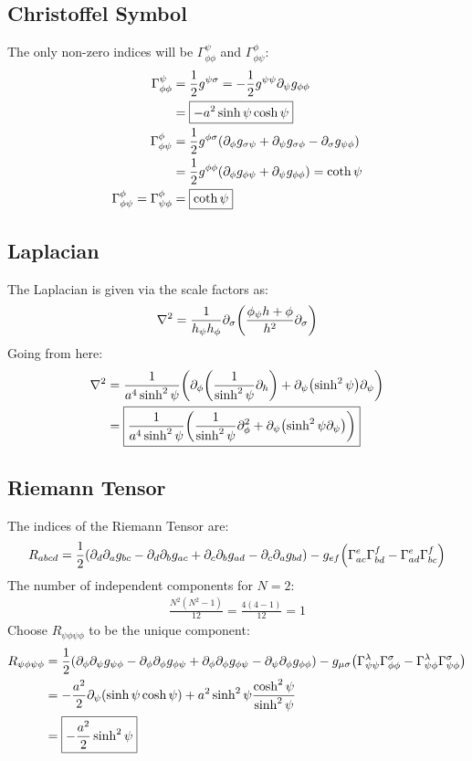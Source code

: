 \documentclass[12pt]{article}
\newcommand{\D}{\partial}
\newcommand{\h}{\phi}
\newcommand{\s}{\psi}
\begin{document}
\subsection{Christoffel Symbol}
The only non-zero indices will be $\Gamma^\s_{\h\h}$ and $\Gamma^\h_{\h\s}$:
\begin{align*}
  \Gamma^\s_{\h\h}&=\frac{1}{2}g^{\s\sigma}=-\frac{1}{2}g^{\s\s}\D_\s g_{\h\h}\\
  &=\boxed{-a^2\sinh\s\cosh\s}\\
  \Gamma^\h_{\h\s}&=\frac{1}{2}g^{\h\sigma}\qty(\D_\h g_{\sigma\s}+
  \D_\s g_{\sigma\h}-\D_\sigma g_{\s\h})\\
  &=\frac{1}{2}g^{\h\h}\qty(\D_\h g_{\h\s}+\D_\s g_{\h\h})=\coth\s\\
  \Gamma^\h_{\h\s}=\Gamma^\h_{\s\h}&=\boxed{\coth\s}
\end{align*}
\subsection{Laplacian}
The Laplacian is given via the scale factors as:
\begin{align*}
  \laplacian = \frac{1}{h_\s h_\h}\D_\sigma\qty(\frac{\h_\s h+\h}{h^2}\D_\sigma)
\end{align*}
Going from here:
\begin{align*}
  \laplacian&=\frac{1}{a^4\sinh^2\s}\qty(\D_\h\qty(\frac{1}{\sinh^2\psi}\D_h)
  +\D_\s\qty(\sinh^2\s)\D_\s)\\
  &=\boxed{\frac{1}{a^4\sinh^2\psi}\qty(\frac{1}{\sinh^2\psi}\D^2_\phi
    +\D_\psi\qty(\sinh^2\psi\D_\psi))}
\end{align*}
\subsection{Riemann Tensor}
The indices of the Riemann Tensor are:
\begin{align*}
  R_{abcd}=\frac{1}{2}(\D_d\D_ag_{bc}-\D_d\D_bg_{ac}+\D_c\D_bg_{ad}-\D_c\D_ag_{bd})
  -g_{ef}\qty(\Gamma^e_{ac}\Gamma^f_{bd}-\Gamma^e_{ad}\Gamma^f_{bc})
\end{align*}
The number of independent components for $N=2$:
\begin{align*}
  \frac{N^2(N^2-1)}{12}=\frac{4(4-1)}{12}=1
\end{align*}
Choose $R_{\s\h\s\h}$ to be the unique component:
\begin{align*}
  R_{\s\h\s\h}&=\frac{1}{2}\qty(\D_\h\D_\s g_{\s\h}-\D_\h\D_\h g_{\h\s}
  +\D_\h\D_\h g_{\h\s}-\D_\s\D_\h g_{\h\h})-g_{\mu\sigma}
  \qty(\Gamma^\lambda_{\s\s}\Gamma^\sigma_{\h\h}-
  \Gamma^\lambda_{\s\h}\Gamma^\sigma_{\s\h})\\
  &=-\frac{a^2}{2}
  \D_\s\qty(\sinh\s\cosh\s)+a^2\sinh^2\s\frac{\cosh^2\s}{\sinh^2\s}\\
  &=\boxed{-\frac{a^2}{2}\sinh^2\s}
\end{align*}
\end{document}
